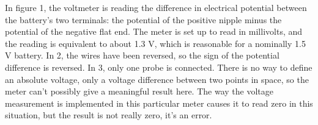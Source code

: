 In figure 1, the voltmeter is reading the difference in electrical potential between the
battery's two terminals: the potential of the positive nipple minus the potential of the negative
flat end. The meter is set up to read in millivolts, and the reading is equivalent to about 1.3 V,
which is reasonable for a nominally 1.5 V battery. In 2, the wires have been reversed, so the sign
of the potential difference is reversed. In 3, only one probe is connected. There is no way to
define an absolute voltage, only a voltage difference between two points in space, so the
meter can't possibly give a meaningful result here. The way the voltage measurement is implemented
in this particular meter causes it to read zero in this situation, but the result is not really zero,
it's an error.
